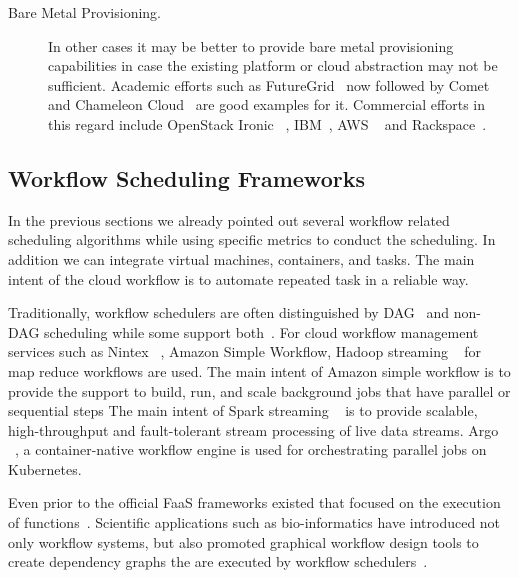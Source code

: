 \documentclass[final,5p,times,twocolumn]{elsarticle}
\begin{document}
\begin{description}
\item[Bare Metal Provisioning.] In other cases it may be better to
  provide bare metal provisioning capabilities in case the
  existing platform or cloud abstraction may not be sufficient.
  Academic efforts such as FutureGrid~\cite{fox2013futuregrid} now
  followed by Comet~\cite{las-comet} and Chameleon Cloud~\cite{Chameleoncloud2019} 
  are good examples for it. Commercial
  efforts in this regard include OpenStack Ironic
 ~\cite{OpenstackIronic2019}, IBM~\cite{IBMBareMetal2019}, AWS
 ~\cite{AWS2019} and Rackspace~\cite{Rackspace2019}.

\end{description}







\subsection{Workflow Scheduling Frameworks} 
\label{sec:workflow}



In the previous sections we already pointed out several workflow
related scheduling algorithms while using specific metrics to conduct
the scheduling. In addition we can integrate virtual machines,
containers, and tasks. The main intent of the cloud workflow is to automate
repeated task in a reliable way. 


Traditionally, workflow schedulers are often distinguished by
DAG~\cite{deelman2005pegasus,deelman2004pegasus,thain2005distributed}
and non-DAG scheduling while some support
both~\cite{las-karajan,las-cogkit-1,las06-workflow-book}.
For cloud workflow management services such as
Nintex ~\cite{www-nintex-wf}, Amazon Simple Workflow,
Hadoop streaming ~\cite{www-hadoop-streaming} for
map reduce workflows are used. The main intent of Amazon
simple workflow is to provide the support to build,
run, and scale background jobs that have parallel or
sequential steps The main intent of Spark
streaming ~\cite{www-spark-streaming} is to provide scalable,
high-throughput and fault-tolerant
stream processing of live data streams. Argo ~\cite{www-argo-wf},
a container-native workflow
engine is used for orchestrating parallel jobs on Kubernetes.

 Even prior
to the official FaaS frameworks existed that focused on the execution
of functions~\cite{las-infogram}.  Scientific applications such as
bio-informatics have introduced not only workflow systems, but also
promoted graphical workflow design tools to create dependency graphs
the are executed by workflow
schedulers~\cite{oinn2004taverna,tan2010comparison}.
  
\end{document}
